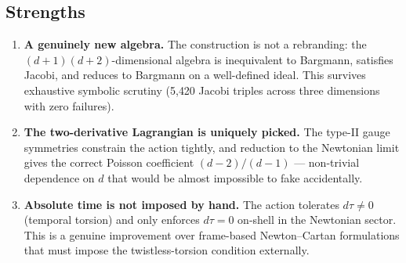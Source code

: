 \documentclass[11pt]{article}
\begin{document}
\subsection{Strengths}
\begin{enumerate}
  \item {\bf A genuinely new algebra.} The construction is not a rebranding: the
        $(d+1)(d+2)$-dimensional algebra is inequivalent to Bargmann, satisfies
        Jacobi, and reduces to Bargmann on a well-defined ideal. This survives
        exhaustive symbolic scrutiny (5{,}420 Jacobi triples across three
        dimensions with zero failures).
  \item {\bf The two-derivative Lagrangian is uniquely picked.} The type-II
        gauge symmetries constrain the action tightly, and reduction to the
        Newtonian limit gives the correct Poisson coefficient $(d-2)/(d-1)$
        --- non-trivial dependence on $d$ that would be almost impossible to
        fake accidentally.
  \item {\bf Absolute time is not imposed by hand.} The action tolerates
        $d\tau\ne 0$ (temporal torsion) and only enforces $d\tau=0$ on-shell in
        the Newtonian sector. This is a genuine improvement over frame-based
        Newton--Cartan formulations that must impose the twistless-torsion
        condition externally.
\end{enumerate}
\end{document}
